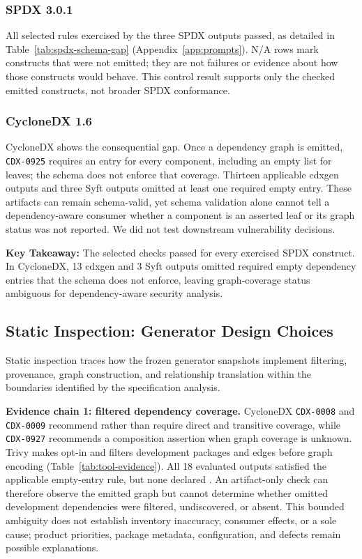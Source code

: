 \subsubsection{SPDX 3.0.1}
All selected rules exercised by the three SPDX outputs passed, as detailed in Table~\ref{tab:spdx-schema-gap} (Appendix~\ref{app:prompts}). N/A rows mark constructs that were not emitted; they are not failures or evidence about how those constructs would behave. This control result supports only the checked emitted constructs, not broader SPDX conformance.


\subsubsection{CycloneDX 1.6}
CycloneDX shows the consequential gap. Once a dependency graph is emitted, \texttt{CDX-0925} requires an entry for every component, including an empty  list for leaves; the schema does not enforce that coverage. Thirteen applicable cdxgen outputs and three Syft outputs omitted at least one required empty entry. These artifacts can remain schema-valid, yet schema validation alone cannot tell a dependency-aware consumer whether a component is an asserted leaf or its graph status was not reported. We did not test downstream vulnerability decisions.

\begin{tcolorbox}[colback=gray!4!white, colframe=black!80, boxrule=0.5pt, arc=5pt, left=2pt, right=2pt, top=1pt, bottom=1pt]
\textbf{Key Takeaway:} The selected checks passed for every exercised SPDX construct. In CycloneDX, 13 cdxgen and 3 Syft outputs omitted required empty dependency entries that the schema does not enforce, leaving graph-coverage status ambiguous for dependency-aware security analysis.
\end{tcolorbox}

\subsection{Static Inspection: Generator Design Choices}
\label{subsec:static-inspection}
Static inspection traces how the frozen generator snapshots implement filtering, provenance, graph construction, and relationship translation within the boundaries identified by the specification analysis.

\textbf{Evidence chain 1: filtered dependency coverage.} CycloneDX \texttt{CDX-0008} and \texttt{CDX-0009} recommend rather than require direct and transitive coverage, while \texttt{CDX-0927} recommends a composition assertion when graph coverage is unknown. Trivy makes  opt-in and filters development packages and edges before graph encoding (Table~\ref{tab:tool-evidence}). All 18 evaluated outputs satisfied the applicable empty-entry rule, but none declared . An artifact-only check can therefore observe the emitted graph but cannot determine whether omitted development dependencies were filtered, undiscovered, or absent. This bounded ambiguity does not establish inventory inaccuracy, consumer effects, or a sole cause; product priorities, package metadata, configuration, and defects remain possible explanations.

